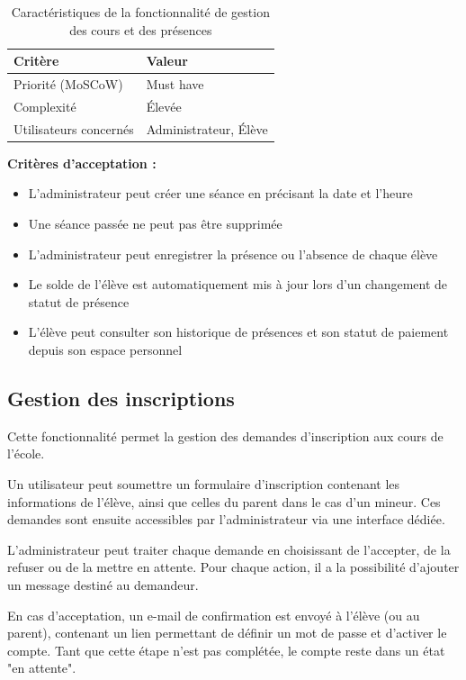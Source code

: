 \documentclass{article}
\begin{document}
\begin{table}[H]
\centering
\begin{tabular}{|p{5cm}|p{7cm}|}
\hline
\textbf{Critère} & \textbf{Valeur} \\
\hline
Priorité (MoSCoW) & Must have \\
\hline
Complexité & Élevée \\
\hline
Utilisateurs concernés & Administrateur, Élève \\
\hline
\end{tabular}
\caption{Caractéristiques de la fonctionnalité de gestion des cours et des présences}
\end{table}

\textbf{Critères d'acceptation :}
\begin{itemize}
    \item L'administrateur peut créer une séance en précisant
    la date et l'heure
    \item Une séance passée ne peut pas être supprimée
    \item L'administrateur peut enregistrer la présence ou 
    l'absence de chaque élève
    \item Le solde de l'élève est automatiquement mis à jour 
    lors d'un changement de statut de présence
    \item L'élève peut consulter son historique de présences 
    et son statut de paiement depuis son espace personnel
\end{itemize}

\subsection{Gestion des inscriptions}

Cette fonctionnalité permet la gestion des demandes d'inscription 
aux cours de l'école.

Un utilisateur peut soumettre un formulaire d'inscription contenant 
les informations de l'élève, ainsi que celles du parent dans le cas 
d'un mineur. Ces demandes sont ensuite accessibles par l'administrateur 
via une interface dédiée.

L'administrateur peut traiter chaque demande en choisissant de 
l'accepter, de la refuser ou de la mettre en attente. Pour chaque 
action, il a la possibilité d'ajouter un message destiné au demandeur.

En cas d'acceptation, un e-mail de confirmation est envoyé à l'élève 
(ou au parent), contenant un lien permettant de définir un mot de passe 
et d'activer le compte. Tant que cette étape n'est pas complétée, le 
compte reste dans un état "en attente".
\end{document}
